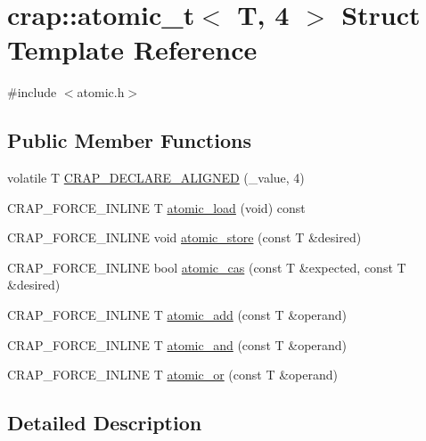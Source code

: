 \hypertarget{structcrap_1_1atomic__t_3_01_t_00_014_01_4}{}\section{crap\+:\+:atomic\+\_\+t$<$ T, 4 $>$ Struct Template Reference}
\label{structcrap_1_1atomic__t_3_01_t_00_014_01_4}


{\ttfamily \#include $<$atomic.\+h$>$}

\subsection*{Public Member Functions}
\begin{DoxyCompactItemize}
\item 
volatile T \hyperlink{structcrap_1_1atomic__t_3_01_t_00_014_01_4_ad923627de05971be07214c919cca097f}{C\+R\+A\+P\+\_\+\+D\+E\+C\+L\+A\+R\+E\+\_\+\+A\+L\+I\+G\+N\+E\+D} (\+\_\+value, 4)
\item 
C\+R\+A\+P\+\_\+\+F\+O\+R\+C\+E\+\_\+\+I\+N\+L\+I\+N\+E T \hyperlink{structcrap_1_1atomic__t_3_01_t_00_014_01_4_a05cd1e73cc789c884b7221b4a977259c}{atomic\+\_\+load} (void) const 
\item 
C\+R\+A\+P\+\_\+\+F\+O\+R\+C\+E\+\_\+\+I\+N\+L\+I\+N\+E void \hyperlink{structcrap_1_1atomic__t_3_01_t_00_014_01_4_aab85d666e2e165c3ce0e0ea7320e22dd}{atomic\+\_\+store} (const T \&desired)
\item 
C\+R\+A\+P\+\_\+\+F\+O\+R\+C\+E\+\_\+\+I\+N\+L\+I\+N\+E bool \hyperlink{structcrap_1_1atomic__t_3_01_t_00_014_01_4_aad6c59f8883b0675d44914020e7817cd}{atomic\+\_\+cas} (const T \&expected, const T \&desired)
\item 
C\+R\+A\+P\+\_\+\+F\+O\+R\+C\+E\+\_\+\+I\+N\+L\+I\+N\+E T \hyperlink{structcrap_1_1atomic__t_3_01_t_00_014_01_4_a598ca4c5dc29306e7548178aa7579668}{atomic\+\_\+add} (const T \&operand)
\item 
C\+R\+A\+P\+\_\+\+F\+O\+R\+C\+E\+\_\+\+I\+N\+L\+I\+N\+E T \hyperlink{structcrap_1_1atomic__t_3_01_t_00_014_01_4_ae83c19e03fc08a4d4b896a0c7552fc67}{atomic\+\_\+and} (const T \&operand)
\item 
C\+R\+A\+P\+\_\+\+F\+O\+R\+C\+E\+\_\+\+I\+N\+L\+I\+N\+E T \hyperlink{structcrap_1_1atomic__t_3_01_t_00_014_01_4_a1366f6e699395e13ee114610b910fb51}{atomic\+\_\+or} (const T \&operand)
\end{DoxyCompactItemize}


\subsection{Detailed Description}
